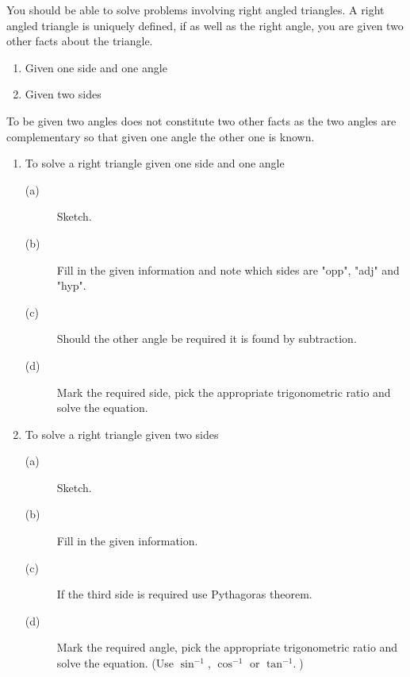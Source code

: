 You should be able to solve problems involving right angled triangles. A
right angled triangle is uniquely defined, if as well as the right angle, you are given two other facts about the triangle. 


\begin{enumerate}
\item Given one side and one angle 

\item Given two sides \end{enumerate}


To be given two angles does not constitute two other facts as the two angles are complementary so that given one angle the other one is known.



\begin{enumerate}
\item To solve a right triangle given one side and one angle 


\begin{description}
\item [(a)] Sketch. 

\item [(b)]
Fill in the given information and note which sides are "opp", "adj" and "hyp". 

\item [(c)]
Should the other angle be required it is found by subtraction. 

\item [(d)]
Mark the required side, pick the appropriate trigonometric ratio and solve the equation. \end{description}

\item To solve a right triangle given two sides 


\begin{description}
\item [(a)] Sketch. 

\item [(b)]
Fill in the given information. 

\item [(c)] If the third side
is required use Pythagoras theorem. 

\item [(d)] Mark the required
angle, pick the appropriate trigonometric ratio and solve the equation. (Use $\sin ^{ -1}$, $\cos ^{ -1}$ or $\tan ^{ -1}\text{.}$) \end{description}\end{enumerate}


